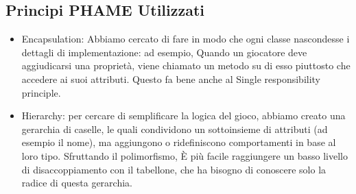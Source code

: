 \documentclass{article}
\begin{document}
\subsection{Principi PHAME Utilizzati}
\begin{itemize}
        \item Encapsulation: Abbiamo cercato di fare in modo che ogni classe nascondesse i dettagli di implementazione: ad esempio, Quando un giocatore deve aggiudicarsi una proprietà, viene chiamato un metodo su di esso piuttosto che accedere ai suoi attributi. Questo fa bene anche al Single responsibility principle.
        \item Hierarchy: per cercare di semplificare la logica del gioco, abbiamo creato una gerarchia di caselle, le quali condividono un sottoinsieme di attributi (ad esempio il nome), ma aggiungono o ridefiniscono comportamenti in base al loro tipo. Sfruttando il polimorfismo, È più facile raggiungere un basso livello di disaccoppiamento con il tabellone, che ha bisogno di conoscere solo la radice di questa gerarchia.
    \end{itemize}
    
\end{document}
